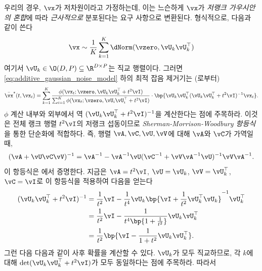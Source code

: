 \documentclass[../../book-main_ko.tex]{subfiles}
\begin{document}
우리의 경우, \(\vx\)가 저차원이라고 가정하는데, 이는 느슨하게 \(\vx\)가 \textit{저랭크 가우시안의 혼합}에 따라 \textit{근사적으로} 분포된다는 요구 사항으로 변환된다. 형식적으로, 다음과 같이 쓴다
\begin{equation}\label{eq:MoG1}
	\vx \sim \frac{1}{K}\sum_{k = 1}^{K}\dNorm(\vzero, \vU_{k}\vU_{k}^{\top})
\end{equation}
여기서 \(\vU_{k} \in \O(D, P) \subseteq \R^{D \times P}\)는 직교 행렬이다. 그러면 \eqref{eq:additive_gaussian_noise_model} 하의 최적 잡음 제거기는 (로부터)
\begin{equation}
	\bar{\vx}^{\ast}(t, \vx_{t}) = \sum_{k = 1}^{K}\frac{\phi(\vx_{t} ; \vzero,
	\vU_{k}\vU_{k}^{\top} + t^{2}\vI)}{\sum_{i = 1}^{K}\phi(\vx_{t} ; \vzero, \vU_{i}\vU_{i}^{\top} + t^{2}\vI)}\cdot\bp{\vU_{k}\vU_{k}^{\top}(\vU_{k}\vU_{k}^{\top} + t^{2}\vI)^{-1}\vx_{t}}.
\end{equation}
\(\phi\) 계산 내부와 외부에서 역 \((\vU_{k}\vU_{k}^{\top} + t^{2}\vI)^{-1}\)을 계산한다는 점에 주목하라. 이것은 전체 랭크 행렬 \(t^{2}\vI\)의 저랭크 섭동이므로 \textit{Sherman-Morrison-Woodbury 항등식}을 통한 단순화에 적합하다. 즉, 행렬 \(\vA, \vC, \vU, \vV\)에 대해 \(\vA\)와 \(\vC\)가 가역일 때,
\begin{equation}\label{eq:sherman_morrison_woodbury}
	(\vA + \vU\vC\vV)^{-1} = \vA^{-1} - \vA^{-1}\vU(\vC^{-1} + \vV\vA^{-1}\vU)^{-1}\vV\vA^{-1}.
\end{equation}
이 항등식은 에서 증명한다. 지금은 \(\vA = t^{2}\vI\), \(\vU = \vU_{k}\), \(\vV = \vU_{k}^{\top}\), \(\vC = \vI\)로 이 항등식을 적용하여 다음을 얻는다
\begin{align}
	(\vU_{k}\vU_{k}^{\top} + t^{2}\vI)^{-1}
	&= \frac{1}{t^{2}}\vI - \frac{1}{t^{4}}\vU_{k}\bp{\vI + \frac{1}{t^{2}}\vU_{k}^{\top}\vU_{k}}^{-1}\vU_{k}^{\top} \\
	&= \frac{1}{t^{2}}\vI - \frac{1}{t^{4}\bp{1 + \frac{1}{t^{2}}}}\vU_{k}\vU_{k}^{\top} \\
	&= \frac{1}{t^{2}}\bp{\vI - \frac{1}{1 + t^{2}}\vU_{k}\vU_{k}^{\top}}.
\end{align}
그런 다음 다음과 같이 사후 확률을 계산할 수 있다. \(\vU_{k}\)가 모두 직교하므로, 각 \(k\)에 대해 \(\det(\vU_{k}\vU_{k}^{\top} + t^{2}\vI)\)가 모두 동일하다는 점에 주목하라. 따라서
\end{document}
